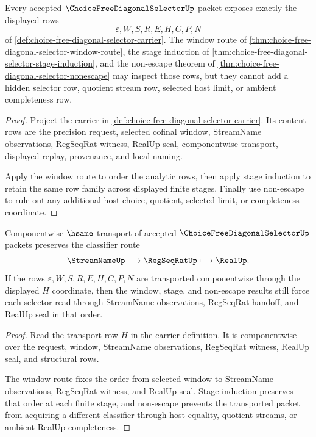 \begin{theorem}
\label{thm:choice-free-diagonal-selector-obligation-carrier}
Every accepted $\ChoiceFreeDiagonalSelectorUp$ packet exposes exactly the displayed rows
$$
\varepsilon,W,S,R,E,H,C,P,N
$$
of \autoref{def:choice-free-diagonal-selector-carrier}. The window route of \autoref{thm:choice-free-diagonal-selector-window-route}, the stage induction of \autoref{thm:choice-free-diagonal-selector-stage-induction}, and the non-escape theorem of \autoref{thm:choice-free-diagonal-selector-nonescape} may inspect those rows, but they cannot add a hidden selector row, quotient stream row, selected host limit, or ambient completeness row.
\end{theorem}
\begin{proof}
Project the carrier in \autoref{def:choice-free-diagonal-selector-carrier}. Its content rows are the precision request, selected cofinal window, StreamName observations, RegSeqRat witness, RealUp seal, componentwise transport, displayed replay, provenance, and local naming.

Apply the window route to order the analytic rows, then apply stage induction to retain the same row family across displayed finite stages. Finally use non-escape to rule out any additional host choice, quotient, selected-limit, or completeness coordinate.
\end{proof}

\begin{theorem}
\label{thm:choice-free-diagonal-selector-obligation-classifier}
Componentwise $\hsame$ transport of accepted $\ChoiceFreeDiagonalSelectorUp$ packets preserves the classifier route
$$
\StreamNameUp\longmapsto \RegSeqRatUp\longmapsto \RealUp.
$$
If the rows $\varepsilon,W,S,R,E,H,C,P,N$ are transported componentwise through the displayed $H$ coordinate, then the window, stage, and non-escape results still force each selector read through StreamName observations, RegSeqRat handoff, and RealUp seal in that order.
\end{theorem}
\begin{proof}
Read the transport row $H$ in the carrier definition. It is componentwise over the request, window, StreamName observations, RegSeqRat witness, RealUp seal, and structural rows.

The window route fixes the order from selected window to StreamName observations, RegSeqRat witness, and RealUp seal. Stage induction preserves that order at each finite stage, and non-escape prevents the transported packet from acquiring a different classifier through host equality, quotient streams, or ambient RealUp completeness.
\end{proof}

